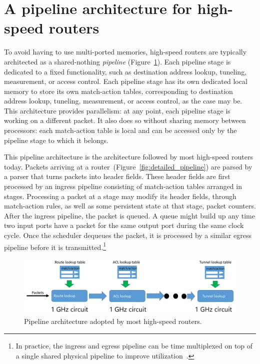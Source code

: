 \section{A pipeline architecture for high-speed routers}
\label{s:router_pipeline_arch}

To avoid having to use multi-ported memories, high-speed routers are typically
architected as a shared-nothing {\em pipeline} (Figure~\ref{fig:pipeline}). Each pipeline stage is
dedicated to a fixed functionality, such as destination address lookup,
tuneling, measurement, or access control. Each pipeline stage has its own
dedicated local memory to store its own match-action tables, corresponding to
destination address lookup, tuneling, measurement, or access control, as the
case may be. This architecture provides parallelism: at any point, each
pipeline stage is working on a different packet. It also does so without
sharing memory between processors: each match-action table is local and can be
accessed only by the pipeline stage to which it belongs.

This pipeline architecture is the architecture followed by most high-speed
routers today. Packets arriving at a
router~(Figure~\ref{fig:detailed_pipeline}) are parsed by a parser that turns
packets into header fields. These header fields are first processed by an
ingress pipeline consisting of match-action tables arranged in stages.
Processing a packet at a stage may modify its header fields, through
match-action rules, as well as some persistent state at that stage, \eg packet
counters. After the ingress pipeline, the packet is queued. A queue might build
up any time two input ports have a packet for the same output port during the
same clock cycle. Once the scheduler dequeues the packet, it is processed by a
similar egress pipeline before it is transmitted.\footnote{In practice, the
ingress and egress pipeline can be time multiplexed on top of a single shared
physical pipeline to improve utilization~\cite{rmt}.}

\begin{figure}[!t]
\includegraphics[width=\textwidth]{pipeline.pdf}
\caption{Pipeline architecture adopted by most high-speed routers.}
\label{fig:pipeline}
\end{figure}

